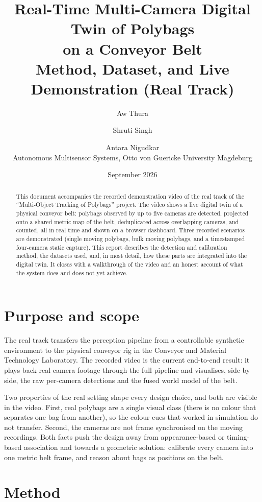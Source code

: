 \documentclass[11pt,a4paper]{article}
\title{\vspace{-1.5em}Real-Time Multi-Camera Digital Twin of Polybags\\
on a Conveyor Belt\\[0.3em]
\large Method, Dataset, and Live Demonstration (Real Track)}
\author{Aw Thura \and Shruti Singh \and Antara Nigudkar\\[0.4em]
\normalsize Autonomous Multisensor Systems, Otto von Guericke University Magdeburg}
\date{September 2026}
\begin{document}
\maketitle

\begin{abstract}
\noindent
This document accompanies the recorded demonstration video of the real track of
the ``Multi-Object Tracking of Polybags'' project. The video shows a live digital
twin of a physical conveyor belt: polybags observed by up to five cameras are
detected, projected onto a shared metric map of the belt, deduplicated across
overlapping cameras, and counted, all in real time and shown on a browser
dashboard. Three recorded scenarios are demonstrated (single moving polybags,
bulk moving polybags, and a timestamped four-camera static capture). This report
describes the detection and calibration method, the datasets used, and, in most
detail, how these parts are integrated into the digital twin. It closes with a
walkthrough of the video and an honest account of what the system does and does
not yet achieve.
\end{abstract}

\section{Purpose and scope}

The real track transfers the perception pipeline from a controllable synthetic
environment to the physical conveyor rig in the Conveyor and Material Technology
Laboratory. The recorded video is the current end-to-end result: it plays back
real camera footage through the full pipeline and visualises, side by side, the
raw per-camera detections and the fused world model of the belt.

Two properties of the real setting shape every design choice, and both are
visible in the video. First, real polybags are a single visual class (there is no
colour that separates one bag from another), so the colour cues that worked in
simulation do not transfer. Second, the cameras are not frame synchronised on the
moving recordings. Both facts push the design away from appearance-based or
timing-based association and towards a geometric solution: calibrate every camera
into one metric belt frame, and reason about bags as positions on the belt.

\section{Method}
\end{document}
